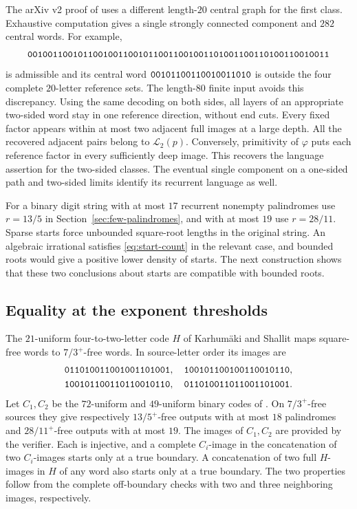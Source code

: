 The arXiv v2 proof of \cite[Theorem~7(a)]{DOO} uses a different length-\(20\) central graph for the first class. Exhaustive computation gives a single strongly connected component and \(282\) central words. For example,
\[
 \mathtt{001001100101100100110010110011001001101001100110100110010011}
\]
is admissible and its central word \(\mathtt{00101100110010011010}\) is outside the four complete \(20\)-letter reference sets. The length-\(80\) finite input avoids this discrepancy. Using the same decoding on both sides, all layers of an appropriate two-sided word stay in one reference direction, without end cuts. Every fixed factor appears within at most two adjacent full images at a large depth. All the recovered adjacent pairs belong to \(\mathcal L_2(p)\). Conversely, primitivity of \(\varphi\) puts each reference factor in every sufficiently deep image. This recovers the language assertion for the two-sided classes. The eventual single component on a one-sided path and two-sided limits identify its recurrent language as well.

For a binary digit string with at most \(17\) recurrent nonempty palindromes use \(r=13/5\) in Section~\ref{sec:few-palindromes}, and with at most \(19\) use \(r=28/11\). Sparse starts force unbounded square-root lengths in the original string. An algebraic irrational satisfies \eqref{eq:start-count} in the relevant case, and bounded roots would give a positive lower density of starts. The next construction shows that these two conclusions about starts are compatible with bounded roots.

\subsection{Equality at the exponent thresholds}

The \(21\)-uniform four-to-two-letter code \(H\) of Karhum\"aki and Shallit \cite[Lemma~8 and Fact~9]{KS} maps square-free words to \(7/3^+\)-free words. In source-letter order its images are
\[
 \begin{gathered}\mathtt{011010011001001101001},\quad\mathtt{100101100100110010110}, \\ \mathtt{100101100110110010110},\quad\mathtt{011010011011001101001}.\end{gathered}
\]
Let \(C_1,C_2\) be the \(72\)-uniform and \(49\)-uniform binary codes of \cite[Theorem~3(e),(f)]{DOO}. On \(7/3^+\)-free sources they give respectively \(13/5^+\)-free outputs with at most \(18\) palindromes and \(28/11^+\)-free outputs with at most \(19\). The images of \(C_1,C_2\) are provided by the verifier. Each is injective, and a complete \(C_i\)-image in the concatenation of two \(C_i\)-images starts only at a true boundary. A concatenation of two full \(H\)-images in \(H\) of any word also starts only at a true boundary. The two properties follow from the complete off-boundary checks with two and three neighboring images, respectively.

